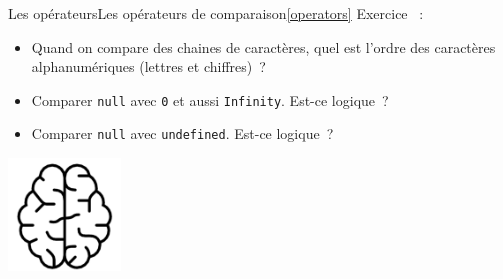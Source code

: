 \documentclass{beamer}
\begin{document}
    \begin{frame}{Les opérateurs}{Les opérateurs de comparaison\cref{operators}}
        Exercice \execcounterdispinc{}~:
        \begin{itemize}
            \item Quand on compare des chaines de caractères, quel est l'ordre des caractères alphanumériques (lettres et chiffres)~?
            \item Comparer \lstinline{null} avec \lstinline{0} et aussi \lstinline{Infinity}. Est-ce logique~?
            \item Comparer \lstinline{null} avec \lstinline{undefined}. Est-ce logique~?
        \end{itemize}
        \bigbreak
        \centering
        \includegraphics[width=3cm]{image/intelligence}
    \end{frame}
\end{document}
